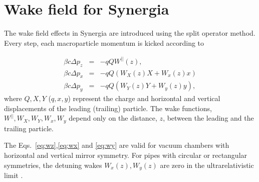 \documentclass[preprint]{revtex4}
\begin{document}
\newcommand{\sech}{\mathop{\mathrm{sech}}\nolimits}
\newcommand{\csch}{\mathop{\mathrm{csch}}\nolimits}
\def\H{{\bar{H}}}
\def\E{{\bar{E}}}
\def\h{{\bar{h}}}
\def\e{{\bar{e}}}
\def\M{{\cal{M}}}
\def\ce{{\cal{E}}}
\def\ch{{\cal{H}}}
\def\R{{\cal{R}}}
\def\O{{\cal{O}}}
\def\T{{\bf{\cal{T}}}}
\def\t{\theta}
\def\a{\bar{a}}
\def\b{\bar{b}}
\def\z{\bar{z}}
\def\x{\bar{x}}
\def\y{\bar{y}}
\def\bxi{\bar{\xi}}
\def\u{\bar{u}}
\def\v{\bar{v}}
\def\w{\bar{w}}
\def\f{\bar{f}}
\def\g{\bar{g}}
\def\W{\tilde{W}}
\def\P{\bar{\Phi}}
\def\Ax{\bar{A_x}}
\def\Ay{\bar{A_y}}
\def\A{\bar{A}}
\def\p{\bar{\phi}}
\def\dP{\overline{\partial \Phi}}
\def\dAx{{{\overline{\partial A}}_x}}
\def\dAy{{{\overline{\partial A}}_y}}
\def\tx{{t_x}}
\def\ty{{t_y}}
\def\nx{{n_x}}
\def\ny{{n_y}}
\def\Q{{\bar{Q}}}






\maketitle

\section{Wake field for Synergia}

The wake field effects in Synergia are introduced using the split operator method. Every step, each macroparticle
momentum is kicked according to

\begin{eqnarray}
\label{eq:wz}
\beta c \Delta p_z &=& -qQ W^{||}(z), \\
\label{eq:wx}
\beta c \Delta p_x &=& -qQ \left( W_X(z) X + W_x(z) x \right)\\
\label{eq:wy}
\beta c \Delta p_y &=& -qQ \left( W_Y(z) Y + W_y(z) y \right),
\end{eqnarray}
\noindent where $Q,X,Y$ ($q,x,y$) represent the charge and horizontal and vertical displacements
of the leading (trailing) particle. The wake functions, $W^{||},W_X, W_Y, W_x, W_y$ 
depend only on the distance, $z$, between the leading and the trailing particle. 



The  Eqs.~\ref{eq:wz},\ref{eq:wx} and \ref{eq:wy} are valid for vacuum chambers
with horizontal and vertical mirror symmetry.  For pipes with circular or rectangular symmetries,
the detuning wakes $W_x(z),W_y(z)$ are zero in the ultrarelativistic limit . 
\end{document}
